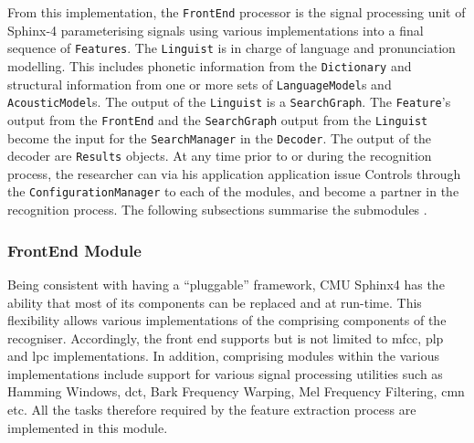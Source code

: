 From this implementation, the \texttt{FrontEnd} processor is the signal processing unit of Sphinx-4 parameterising signals using various implementations into a final sequence of \texttt{Features}.  The \texttt{Linguist} is in charge of language and pronunciation modelling.  This includes phonetic information from the \texttt{Dictionary} and structural information from one or more sets of \texttt{LanguageModel}s and \texttt{AcousticModel}s.  The output of the \texttt{Linguist} is a \texttt{SearchGraph}.  The \texttt{Feature}'s output from the \texttt{FrontEnd} and the \texttt{SearchGraph} output from the \texttt{Linguist} become the input for the \texttt{SearchManager} in the \texttt{Decoder}.  The output of the decoder are \texttt{Results} objects.  At any time prior to or during the recognition process, the researcher can via his application application issue Controls  through the \texttt{ConfigurationManager} to each of the modules, and become a partner in the recognition process.  The following subsections summarise the submodules \citep{walker2004sphinx}.

\subsubsection{FrontEnd Module}
Being consistent with having a ``pluggable'' framework, CMU Sphinx4 has the ability that most of its components can be replaced and at run-time.  This flexibility allows various implementations of the comprising components of the recogniser.  Accordingly, the front end supports but is not limited to \acrfull{mfcc}, \acrfull{plp} and \acrfull{lpc} implementations.  In addition, comprising modules within the various implementations include support for various signal processing utilities such as Hamming Windows, \acrfull{dct}, Bark Frequency Warping, Mel Frequency Filtering, \acrfull{cmn} etc.  All the tasks therefore required by the feature extraction process are implemented in this module.

